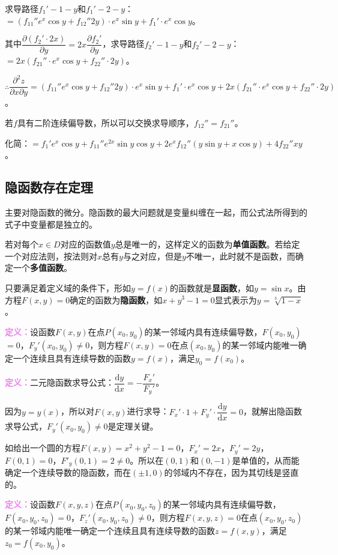求导路径$f_1'-1-y$和$f_1'-2-y$：$=(f_{11}''e^x\cos y+f_{12}''2y)\cdot e^x\sin y+f_1'\cdot e^x\cos y$。

其中$\dfrac{\partial(f_2'\cdot2x)}{\partial y}=2x\dfrac{\partial f_2'}{\partial y}$，求导路径$f_2'-1-y$和$f_2'-2-y$：$=2x(f_{21}''\cdot e^x\cos y+f_{22}''\cdot2y)$。

$\therefore\dfrac{\partial^2z}{\partial x\partial y}=(f_{11}''e^x\cos y+f_{12}''2y)\cdot e^x\sin y+f_1'\cdot e^x\cos y+2x(f_{21}''\cdot e^x\cos y+f_{22}''\cdot2y)$。

若$f$具有二阶连续偏导数，所以可以交换求导顺序，$f_{12}''=f_{21}''$。

化简：$=f_1'e^x\cos y+f_{11}''e^{2x}\sin y\cos y+2e^xf_{12}''(y\sin y+x\cos y)+4f_{22}''xy$。

\subsection{隐函数存在定理}

主要对隐函数的微分。隐函数的最大问题就是变量纠缠在一起，而公式法所得到的式子中变量都是独立的。

若对每个$x\in D$对应的函数值$y$总是唯一的，这样定义的函数为\textbf{单值函数}。若给定一个对应法则，按法则对$x$总有$y$与之对应，但是$y$不唯一，此时就不是函数，而确定一个\textbf{多值函数}。

只要满足着定义域的条件下，形如$y=f(x)$的函数就是\textbf{显函数}，如$y=\sin x$。由方程$F(x,y)=0$确定的函数为\textbf{隐函数}，如$x+y^3-1=0$显式表示为$y=\sqrt[3]{1-x}$。

\textcolor{violet}{\textbf{定义：}}设函数$F(x,y)$在点$P(x_0,y_0)$的某一邻域内具有连续偏导数，$F(x_0,y_0)$\\$=0$，$F_y'(x_0,y_0)\neq0$，则方程$F(x,y)=0$在点$(x_0,y_0)$的某一邻域内能唯一确定一个连续且具有连续导数的函数$y=f(x)$，满足$y_0=f(x_0)$。

\textcolor{violet}{\textbf{定义：}}二元隐函数求导公式：$\dfrac{\textrm{d}y}{\textrm{d}x}=-\dfrac{F_x'}{F_y'}$。

因为$y=y(x)$，所以对$F(x,y)$进行求导：$F_x'\cdot1+F_y'\cdot\dfrac{\textrm{d}y}{\textrm{d}x}=0$，就解出隐函数求导公式，$F_y'(x_0,y_0)\neq0$是定理关键。

如给出一个圆的方程$F(x,y)=x^2+y^2-1=0$，$F_x'=2x$，$F_y'=2y$，$F(0,1)=0$，$F'_y(0,1)=2\neq0$。所以在$(0,1)$和$(0,-1)$是单值的，从而能确定一个连续导数的隐函数，而在$(\pm1,0)$的邻域内不存在，因为其切线是竖直的。

\textcolor{violet}{\textbf{定义：}}设函数$F(x,y,z)$在点$P(x_0,y_0,z_0)$的某一邻域内具有连续偏导数，$F(x_0,y_0,z_0)=0$，$F_z'(x_0,y_0,z_0)\neq0$，则方程$F(x,y,z)=0$在点$(x_0,y_0,z_0)$的某一邻域内能唯一确定一个连续且具有连续导数的函数$z=f(x,y)$，满足$z_0=f(x_0,y_0)$。

